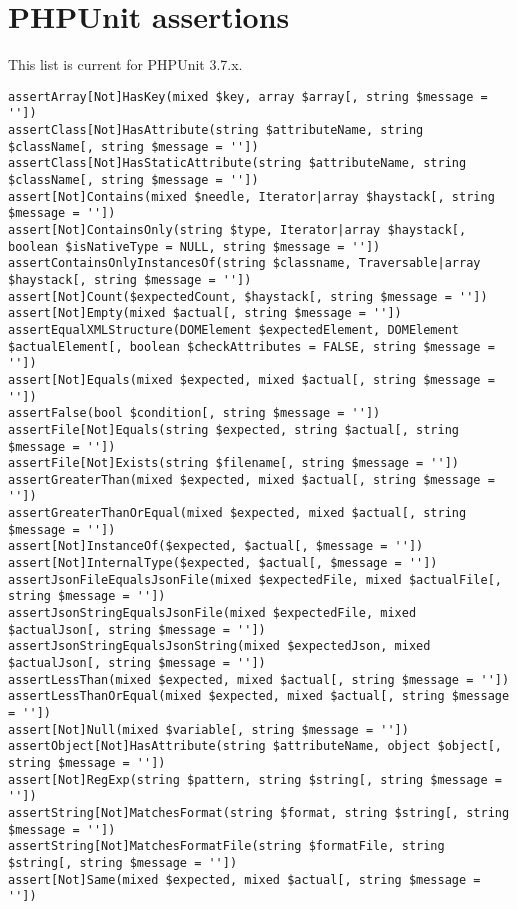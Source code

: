 \documentclass[a4paper,twoside,landscape]{scrartcl}
\begin{document}
\section{PHPUnit assertions}
This list is current for PHPUnit 3.7.x.

\footnotesize
\begin{verbatim}
assertArray[Not]HasKey(mixed $key, array $array[, string $message = ''])
assertClass[Not]HasAttribute(string $attributeName, string $className[, string $message = ''])
assertClass[Not]HasStaticAttribute(string $attributeName, string $className[, string $message = ''])
assert[Not]Contains(mixed $needle, Iterator|array $haystack[, string $message = ''])
assert[Not]ContainsOnly(string $type, Iterator|array $haystack[, boolean $isNativeType = NULL, string $message = ''])
assertContainsOnlyInstancesOf(string $classname, Traversable|array $haystack[, string $message = ''])
assert[Not]Count($expectedCount, $haystack[, string $message = ''])
assert[Not]Empty(mixed $actual[, string $message = ''])
assertEqualXMLStructure(DOMElement $expectedElement, DOMElement $actualElement[, boolean $checkAttributes = FALSE, string $message = ''])
assert[Not]Equals(mixed $expected, mixed $actual[, string $message = ''])
assertFalse(bool $condition[, string $message = ''])
assertFile[Not]Equals(string $expected, string $actual[, string $message = ''])
assertFile[Not]Exists(string $filename[, string $message = ''])
assertGreaterThan(mixed $expected, mixed $actual[, string $message = ''])
assertGreaterThanOrEqual(mixed $expected, mixed $actual[, string $message = ''])
assert[Not]InstanceOf($expected, $actual[, $message = ''])
assert[Not]InternalType($expected, $actual[, $message = ''])
assertJsonFileEqualsJsonFile(mixed $expectedFile, mixed $actualFile[, string $message = ''])
assertJsonStringEqualsJsonFile(mixed $expectedFile, mixed $actualJson[, string $message = ''])
assertJsonStringEqualsJsonString(mixed $expectedJson, mixed $actualJson[, string $message = ''])
assertLessThan(mixed $expected, mixed $actual[, string $message = ''])
assertLessThanOrEqual(mixed $expected, mixed $actual[, string $message = ''])
assert[Not]Null(mixed $variable[, string $message = ''])
assertObject[Not]HasAttribute(string $attributeName, object $object[, string $message = ''])
assert[Not]RegExp(string $pattern, string $string[, string $message = ''])
assertString[Not]MatchesFormat(string $format, string $string[, string $message = ''])
assertString[Not]MatchesFormatFile(string $formatFile, string $string[, string $message = ''])
assert[Not]Same(mixed $expected, mixed $actual[, string $message = ''])

\end{verbatim}
\end{document}
